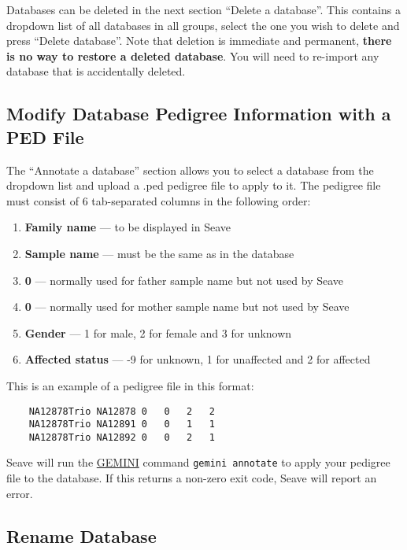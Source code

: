 \documentclass[11pt, a4paper]{article}
\newcommand{\GEMINI}{\href{https://gemini.readthedocs.io}{GEMINI} } %
\begin{document}
Databases can be deleted in the next section ``Delete a database''. This contains a dropdown list of all databases in all groups, select the one you wish to delete and press ``Delete database''. Note that deletion is immediate and permanent, \textbf{there is no way to restore a deleted database}. You will need to re-import any database that is accidentally deleted.


\subsection{Modify Database Pedigree Information with a PED File}

The ``Annotate a database'' section allows you to select a database from the dropdown list and upload a .ped pedigree file to apply to it. The pedigree file must consist of 6 tab-separated columns in the following order:

\begin{enumerate}
	\item \textbf{Family name} --- to be displayed in Seave
	\item \textbf{Sample name} --- must be the same as in the database
	\item \textbf{0} --- normally used for father sample name but not used by Seave
	\item \textbf{0} --- normally used for mother sample name but not used by Seave
	\item \textbf{Gender} --- 1 for male, 2 for female and 3 for unknown
	\item \textbf{Affected status} --- -9 for unknown, 1 for unaffected and 2 for affected
\end{enumerate}

This is an example of a pedigree file in this format:

\begin{lstlisting}
    NA12878Trio	NA12878	0	0	2	2
    NA12878Trio	NA12891	0	0	1	1
    NA12878Trio	NA12892	0	0	2	1
\end{lstlisting}

Seave will run the \GEMINI command \texttt{gemini annotate} to apply your pedigree file to the database. If this returns a non-zero exit code, Seave will report an error.


\subsection{Rename Database}
\end{document}
